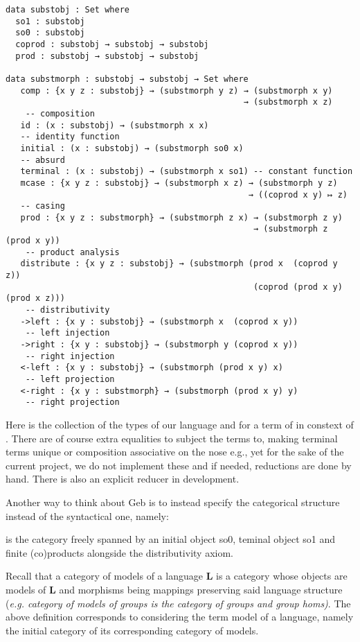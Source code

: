 \begin{verbatim}
data substobj : Set where
  so1 : substobj
  so0 : substobj
  coprod : substobj → substobj → substobj
  prod : substobj → substobj → substobj

data substmorph : substobj → substobj → Set where
   comp : {x y z : substobj} → (substmorph y z) → (substmorph x y) 
                                                → (substmorph x z) 
    -- composition
   id : (x : substobj) → (substmorph x x) 
   -- identity function
   initial : (x : substobj) → (substmorph so0 x) 
   -- absurd 
   terminal : (x : substobj) → (substmorph x so1) -- constant function
   mcase : {x y z : substobj} → (substmorph x z) → (substmorph y z) 
                                                 → ((coprod x y) ↦ z)
   -- casing 
   prod : {x y z : substmorph} → (substmorph z x) → (substmorph z y) 
                                                  → (substmorph z (prod x y))
    -- product analysis
   distribute : {x y z : substobj} → (substmorph (prod x  (coprod y z)) 
                                                  (coprod (prod x y) (prod x z)))
    -- distributivity
   ->left : {x y : substobj} → (substmorph x  (coprod x y))
    -- left injection
   ->right : {x y : substobj} → (substmorph y (coprod x y))
    -- right injection
   <-left : {x y : substobj} → (substmorph (prod x y) x)
    -- left projection
   <-right : {x y : substmorph} → (substmorph (prod x y) y) 
    -- right projection
\end{verbatim}

Here \gebobj is the collection of the types of our language and  for a term of  in constext of . There are of course extra equalities to subject the terms to, making terminal terms unique or composition associative on the nose e.g., yet for the sake of the current project, we do not implement these and if needed, reductions are done by hand. There is also an explicit reducer in development.

Another way to think about Geb is to instead specify the categorical structure instead of the syntactical one, namely:
\begin{definition}
 is the category freely spanned by an initial object so0, teminal object so1 and finite (co)products alongside the distributivity axiom.
\end{definition}

Recall that a category of models of a language $\mathbf{L}$ is a category whose objects are models of $\mathbf{L}$ and morphisms being mappings preserving said language structure (\textit{e.g. category of models of groups is the category of groups and group homs)}. The above definition corresponds to considering the term model of a language, namely the initial category of its corresponding category of models.

